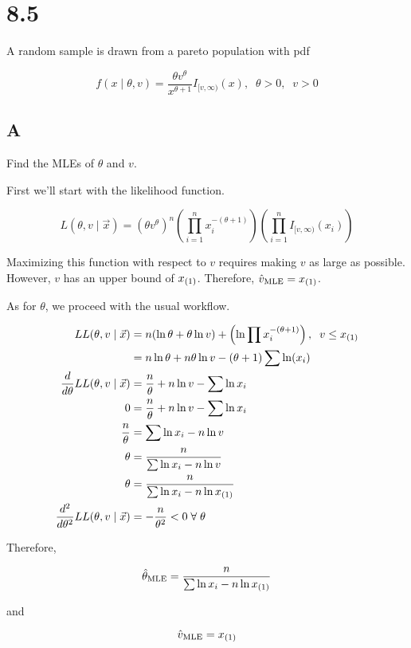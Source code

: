 \section*{8.5}

A random sample \rs is drawn from a pareto population with pdf

\[
	f(x \mid \theta, v) = \frac{\theta v^{\theta}}{x^{\theta + 1}} I_{[v,\infty)}(x), \;\; \theta > 0, \;\; v > 0
\]

\subsection*{A}

Find the MLEs of $\theta$ and $v$.

First we'll start with the likelihood function.

\[
	L(\theta, v \mid \vec{x}) = \left( \theta v^{\theta} \right)^n \left( \prod_{i=1}^n x_i^{-(\theta + 1)} \right) \left( \prod_{i=1}^n  I_{[v,\infty)}(x_i) \right)
\]

Maximizing this function with respect to $v$ requires making $v$ as large as possible. However, $v$ has an upper bound of $x_{(1)}$. Therefore, $\hat{v}_{\text{MLE}} = x_{(1)}$.

As for $\theta$, we proceed with the usual workflow.

\begin{align*}
	LL(\theta, v \mid \vec{x}) &= n(\ln\theta + \theta\ln v) + \left( \ln \prod x_i^{-(\theta + 1)} \right), \;\; v \leq x_{(1)} \\
	&= n\ln\theta + n\theta\ln v - (\theta + 1) \sum \ln(x_i) \\
	\frac{d}{d\theta} LL(\theta, v \mid \vec{x}) &= \frac{n}{\theta} + n\ln v - \sum \ln x_i \\
	0 &= \frac{n}{\theta} + n\ln v - \sum \ln x_i \\
	\frac{n}{\theta} &= \sum \ln x_i - n\ln v \\
	\theta &= \frac{n}{\sum \ln x_i - n\ln v} \\
	\theta &= \frac{n}{\sum \ln x_i - n\ln x_{(1)}} \\
	\frac{d^2}{d\theta^2} LL(\theta, v \mid \vec{x}) &= -\frac{n}{\theta^2} < 0 \; \forall \; \theta
\end{align*}

Therefore,

\[
	\hat{\theta}_{\text{MLE}} = \frac{n}{\sum \ln x_i - n\ln x_{(1)}}
\]

and

\[
	\hat{v}_{\text{MLE}} = x_{(1)}
\]

